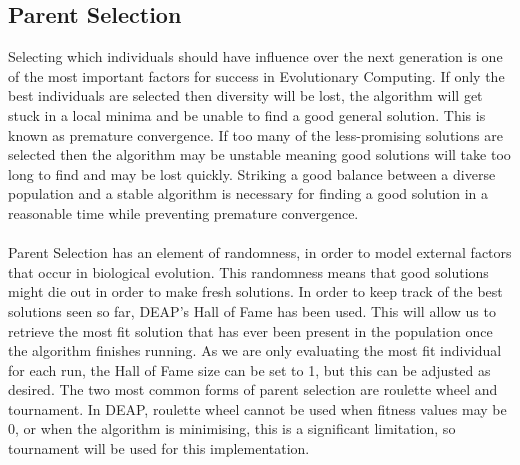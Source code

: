 \documentclass[12pt]{article}
\begin{document}
\subsection{Parent Selection}
\label{selection}
Selecting which individuals should have influence over the next generation is one of the most important factors for success in Evolutionary Computing. If only the best individuals are selected then diversity will be lost, the algorithm will get stuck in a local minima and be unable to find a good general solution. This is known as premature convergence. If too many of the less-promising solutions are selected then the algorithm may be unstable meaning good solutions will take too long to find and may be lost quickly. Striking a good balance between a diverse population and a stable algorithm is necessary for finding a good solution in a reasonable time while preventing premature convergence.
\\\\
Parent Selection has an element of randomness, in order to model external factors that occur in biological evolution. This randomness means that good solutions might die out in order to make fresh solutions. In order to keep track of the best solutions seen so far, DEAP's Hall of Fame has been used. This will allow us to retrieve the most fit solution that has ever been present in the population once the algorithm finishes running. As we are only evaluating the most fit individual for each run, the Hall of Fame size can be set to 1, but this can be adjusted as desired. The two most common forms of parent selection are roulette wheel and tournament. In DEAP, roulette wheel cannot be used when fitness values may be 0, or when the algorithm is minimising, this is a significant limitation, so tournament will be used for this implementation.
\end{document}
